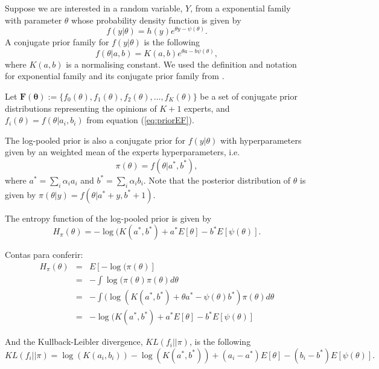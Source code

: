 \documentclass[a4paper, notitlepage, 11pt]{article}
\begin{document}
Suppose we are interested in a random variable, $Y$, from a exponential family with parameter $\theta$ whose probability density function is given by
\begin{equation} \label{eq:exponentialfamily}
f(y|\theta) = h(y) e^{\theta y - \psi(\theta)}.
\end{equation}
A conjugate prior family for $f(y|\theta)$ is the following
\begin{equation} \label{eq:priorEF}
f(\theta | a, b) = K(a,b) e^{\theta a - b \psi(\theta)},
\end{equation}
where $K(a,b)$ is a normalising constant. We used the definition and notation for exponential family and its conjugate prior family from \citet[chapter 3]{robert2001bayesian}.

Let $\mathbf{F(\theta)} := \{f_0(\theta), f_1(\theta), f_2(\theta), \ldots, f_K(\theta)\}$ be a set of conjugate prior distributions representing the opinions of $K+1$ experts, and $f_i(\theta) = f(\theta | a_i, b_i)$ from equation (\ref{eq:priorEF}).

The log-pooled prior is also a conjugate prior for $f(y|\theta)$ with hyperparameters given by an weighted mean of the experts hyperparameters, i.e.
\begin{equation}
\pi(\theta) = f(\theta | a^*, b^*),
\end{equation}
where $a^* = \sum_{i} \alpha_i a_i$ and $b^* = \sum_{i} \alpha_i b_i$. Note that the posterior distribution of $\theta$ is given by $\pi(\theta | y) = f(\theta | a^* + y, b^* + 1)$.

The entropy function of the log-pooled prior is given by
\begin{equation} \label{eq:entropypriorEF}
H_\pi(\theta) = - \log(K(a^*, b^*) + a^*  E[\theta]-  b^*  E[\psi(\theta)].
\end{equation}

Contas para conferir:
\begin{eqnarray*} 
H_\pi(\theta) & = & E[-\log(\pi(\theta)] \\
              & = & - \int \log(\pi(\theta) \pi(\theta) d\theta \\
              & = & - \int (\log(K(a^*, b^*) + \theta a^* - \psi(\theta) b^*) \pi(\theta) d\theta \\
              & = & - \log(K(a^*, b^*) + a^*  E[\theta]-  b^*  E[\psi(\theta)]
\end{eqnarray*}


And the Kullback-Leibler divergence, $KL(f_i || \pi)$, is the following
\begin{equation} \label{eq:KLpriorEF}
KL(f_i || \pi) = \log( K(a_i,b_i)) - \log(K(a^*,b^*)) + (a_i - a^*) E[\theta] - (b_i - b^*) E[\psi(\theta)] .
\end{equation}
\end{document}
